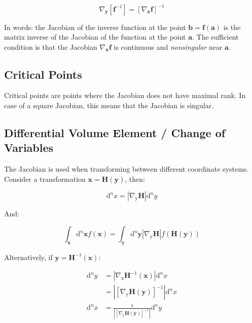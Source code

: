 \begin{equation}
\nabla_\mathbf{y}\left[\mathbf{f}^{-1}\right] = \left[\nabla_\mathbf{x} \mathbf{f} \right]^{-1}
\end{equation}

In words: the Jacobian of the inverse function at the point $\mathbf{b} = \mathbf{f}(\mathbf{a})$ is the matrix inverse of the Jacobian of the function at the point $\mathbf{a}$. The sufficient condition is that the Jacobian $\nabla_\mathbf{x}\mathbf{f}$ is continuous and \textit{nonsingular} near $\mathbf{a}$.

\subsection{Critical Points}
Critical points are points where the Jacobian does not have maximal rank. In case of a square Jacobian, this means that the Jacobian is singular. 

\subsection{Differential Volume Element / Change of Variables}
The Jacobian is used when transforming between different coordinate systems. Consider a transformation $\mathbf{x} = \mathbf{H}(\mathbf{y})$, then:

\begin{equation}
\mathrm{d}^n x = \left|\nabla_\mathrm{y} \mathbf{H} \right| \mathrm{d}^n y
\end{equation}

And:

\begin{equation}
\int_\mathbf{x} \mathrm{d}^n\mathbf{x} f(\mathbf{x}) = \int_\mathbf{y} \mathrm{d}^n\mathbf{y} \left|\nabla_\mathrm{y} \mathbf{H} \right| f(\mathbf{H}(\mathbf{y}))
\end{equation}

Alternatively, if $\mathbf{y} = \mathbf{H}^{-1}(\mathbf{x})$:

 \begin{equation}
 \begin{array}{rl}
 \mathrm{d}^n y &= \left|\nabla_\mathrm{x} \mathbf{H}^{-1}(\mathbf{x})\right| \mathrm{d}^n x\\
 &= \left| \left[ \nabla_\mathrm{y} \mathbf{H}(\mathbf{y}) \right]^{-1} \right| \mathrm{d}^n x\\
 \mathrm{d}^n x &= \frac{1}{\left| \left[ \nabla_\mathrm{y} \mathbf{H}(\mathbf{y}) \right]^{-1} \right|}  \mathrm{d}^n y 
 \end{array}
 \end{equation}

